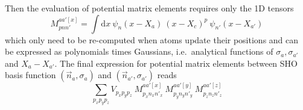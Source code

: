 \documentclass[oribibl]{llncs}
\begin{document}
\noindent
Then the evaluation of potential matrix elements requires only the 1D tensors
\begin{equation}
	M_{pnn'}^{aa'[x]} = \int \mathrm d x  \  \psi_{n}(x - X_{a}) \  (x - X_{c})^{p} \  \psi_{n'}(x - X_{a'})
	\label{eq:local_moment_matrix_elements}
\end{equation}
which only need to be re-computed when atoms update their positions
and can be expressed as polynomials times Gaussians, i.e.~analytical functions of $\sigma_a, \sigma_{a'}$ and $X_a - X_{a'}$.
The final expression for potential matrix elements between SHO basis function $(\vec n_a,\sigma_a)$ and $(\vec n_{a'},\sigma_{a'})$ reads
\begin{equation}
	\sum_{p_x p_y p_z} V_{p_x p_y p_z} \  M_{p_x n_x n'_x}^{aa'[x]} \  M_{p_y n_y n'_y}^{aa'[y]} \  M_{p_z n_z n'_z}^{aa'[z]}
	\label{eq:local_moment_matrix_elements_from_tensors}
\end{equation}
\end{document}
